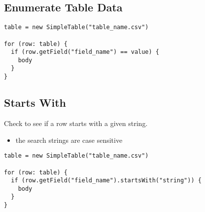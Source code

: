 \documentclass{article}
\begin{document}
\subsection{Enumerate Table Data}
\begin{lstlisting}
table = new SimpleTable("table_name.csv")

for (row: table) {
  if (row.getField("field_name") == value) {
    body
  }
}
\end{lstlisting}

\subsection{Starts With}
Check to see if a row starts with a given string.
\begin{itemize}
  \item the search strings are case sensitive
\end{itemize}
\begin{lstlisting}
table = new SimpleTable("table_name.csv")

for (row: table) {
  if (row.getField("field_name").startsWith("string")) {
    body
  }
}
\end{lstlisting}


\newpage

%

\end{document}
